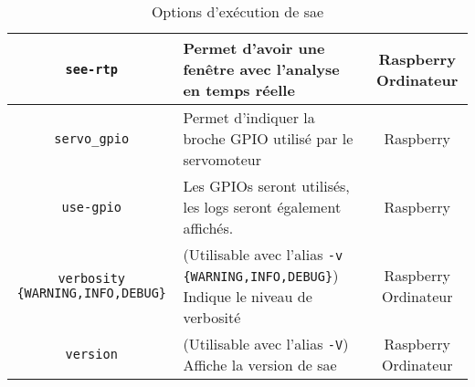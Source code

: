 \begin{table}[H]
\begin{tabularx}{\linewidth}{|c|X|c|}
        \verb=see-rtp=                               & Permet d'avoir une fenêtre avec l'analyse en temps réelle                                                                                                         & Raspberry Ordinateur    \\\hline
        \verb=servo_gpio=                            & Permet d'indiquer la broche GPIO utilisé par le servomoteur                                                                                                       & Raspberry               \\\hline        
        \verb=use-gpio=                              & Les GPIOs seront utilisés, les logs seront également affichés.                                                                                                    & Raspberry               \\\hline
        \verb=verbosity {WARNING,INFO,DEBUG}=        & (Utilisable avec l'alias \verb=-v {WARNING,INFO,DEBUG}=) Indique le niveau de verbosité                                                                           & Raspberry Ordinateur    \\\hline
        \verb=version=                               & (Utilisable avec l'alias \verb=-V=) Affiche la version de \gls{sae}                                                                                               & Raspberry Ordinateur    \\\hline
    \end{tabularx}
    \label{tabOptClearway}
    \caption{Options d'exécution de \gls{sae}}
\end{table}

